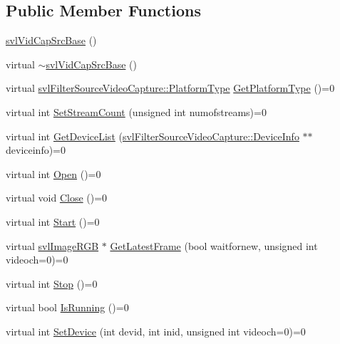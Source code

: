 \subsection*{Public Member Functions}
\begin{DoxyCompactItemize}
\item 
\hyperlink{classsvl_vid_cap_src_base_ab8cc8201078038fd5f5313c05f87dcac}{svl\+Vid\+Cap\+Src\+Base} ()
\item 
virtual \hyperlink{classsvl_vid_cap_src_base_a77cc24bcfb46dff52df9f6d2dd1d90b9}{$\sim$svl\+Vid\+Cap\+Src\+Base} ()
\item 
virtual \hyperlink{classsvl_filter_source_video_capture_a75f10dbd026c0ae70007a18758895ea0}{svl\+Filter\+Source\+Video\+Capture\+::\+Platform\+Type} \hyperlink{classsvl_vid_cap_src_base_a68051fa2425450d680972590ca46d3fc}{Get\+Platform\+Type} ()=0
\item 
virtual int \hyperlink{classsvl_vid_cap_src_base_ae404263240c88e7752f5951b3e7a0ec3}{Set\+Stream\+Count} (unsigned int numofstreams)=0
\item 
virtual int \hyperlink{classsvl_vid_cap_src_base_ada28da77dd5c4a52f018b0499a07f8cb}{Get\+Device\+List} (\hyperlink{classsvl_filter_source_video_capture_ad656487fb2deec890dc39764152b8f8b}{svl\+Filter\+Source\+Video\+Capture\+::\+Device\+Info} $\ast$$\ast$deviceinfo)=0
\item 
virtual int \hyperlink{classsvl_vid_cap_src_base_a2855a57b3e6bb2be4a1020600fb76b4b}{Open} ()=0
\item 
virtual void \hyperlink{classsvl_vid_cap_src_base_a7a3a449ce94eee9ebe05111bb98dea2b}{Close} ()=0
\item 
virtual int \hyperlink{classsvl_vid_cap_src_base_a591d834d9e9667140032244038419080}{Start} ()=0
\item 
virtual \hyperlink{svl_types_8h_a7b03c3d61bbbbf8fe59585453969d250}{svl\+Image\+R\+G\+B} $\ast$ \hyperlink{classsvl_vid_cap_src_base_a262ea84a6bd1dfda77e41a1e04525fc8}{Get\+Latest\+Frame} (bool waitfornew, unsigned int videoch=0)=0
\item 
virtual int \hyperlink{classsvl_vid_cap_src_base_a8991f55335b8fb8aaf8a20ed28435a86}{Stop} ()=0
\item 
virtual bool \hyperlink{classsvl_vid_cap_src_base_a5ffea8235203732a10dadacf8feb5a4d}{Is\+Running} ()=0
\item 
virtual int \hyperlink{classsvl_vid_cap_src_base_a140b325929146f88f394e5c5dc6b11bf}{Set\+Device} (int devid, int inid, unsigned int videoch=0)=0
\item 
$$
\end{DoxyCompactItemize}
